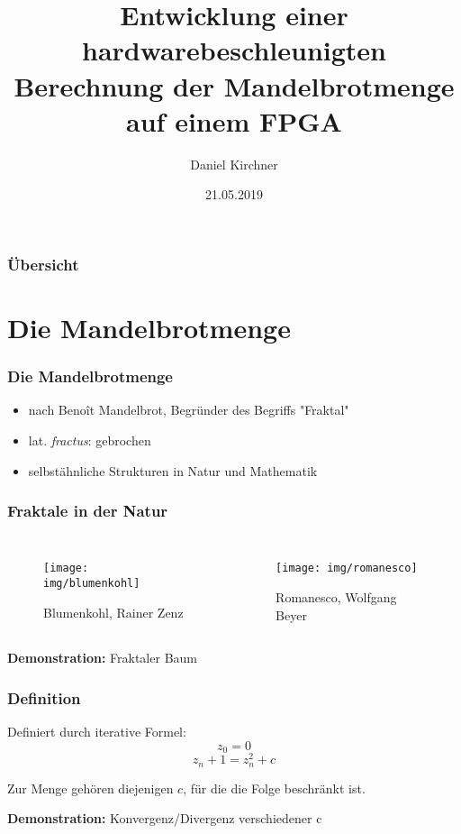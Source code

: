 \documentclass{beamer}
\title[D. Kirchner, Mandelbrotmenge in Hardware]{Entwicklung einer hardwarebeschleunigten Berechnung der Mandelbrotmenge auf einem FPGA} %
\author{Daniel Kirchner}
\institute[HS Coburg]
{
Hochschule Coburg
\medskip
}
\date{21.05.2019}
\begin{document}
\frame{\titlepage}

\begin{frame}
    \frametitle{Übersicht}
    \tableofcontents
\end{frame}

\section{Die Mandelbrotmenge}
\begin{frame}
    \frametitle{Die Mandelbrotmenge}
    \begin{itemize}
        \item {nach Benoît Mandelbrot, Begründer des Begriffs "Fraktal"}
        \item lat. \textit{fractus}: gebrochen
        \item selbstähnliche Strukturen in Natur und Mathematik
    \end{itemize}
\end{frame}

\begin{frame}
    \frametitle{Fraktale in der Natur}
    \begin{columns}[c]
            \begin{figure}
            \texttt{[image: img/blumenkohl]}
            \caption{Blumenkohl, Rainer Zenz} 
            \end{figure}
            \begin{figure}
            \texttt{[image: img/romanesco]}
            \caption{Romanesco, Wolfgang Beyer}
            \end{figure}
    \end{columns}
\end{frame}

\begin{frame}
    \centering \textbf{Demonstration:} Fraktaler Baum
\end{frame}

\begin{frame}
    \frametitle{Definition}
    Definiert durch iterative Formel:\\
    \[z_0 = 0\]
    \[z_n+1 = z_n^2 + c\]
    
    Zur Menge gehören diejenigen $c$, für die die Folge beschränkt ist.
\end{frame}

\begin{frame}
    \centering \textbf{Demonstration:} Konvergenz/Divergenz verschiedener c
\end{frame}
\end{document}
